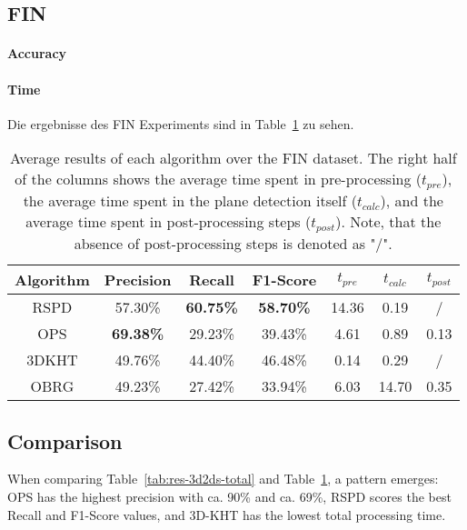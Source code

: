 \documentclass[main.tex]{subfiles}
\begin{document}
\subsection{FIN}

\paragraph{Accuracy}

\paragraph{Time}

Die ergebnisse des FIN Experiments sind in Table~\ref{tab:res-fin-total} zu sehen.

\begin{table}[H]
    \centering
    \begin{tabular}{c|cccccc}
        Algorithm & Precision        & Recall           & F1-Score         & $t_{pre}$ & $t_{calc}$ & $t_{post}$ \\ \hline
        RSPD      & 57.30\%          & \textbf{60.75\%} & \textbf{58.70\%} & 14.36     & 0.19       & /          \\
        OPS       & \textbf{69.38\%} & 29.23\%          & 39.43\%          & 4.61      & 0.89       & 0.13       \\
        3DKHT     & 49.76\%          & 44.40\%          & 46.48\%          & 0.14      & 0.29       & /          \\
        OBRG      & 49.23\%          & 27.42\%          & 33.94\%          & 6.03      & 14.70      & 0.35
    \end{tabular}
    \caption[Overall 2D-3D-S Results]{Average results of each algorithm over the FIN dataset. The right half of the columns shows the average time spent in
        pre-processing ($t_{pre}$), the average time spent in the plane detection itself ($t_{calc}$), and the average time spent in post-processing steps ($t_{post}$).
        Note, that the absence of post-processing steps is denoted as "/".}
    \label{tab:res-fin-total}
\end{table}

\subsection{Comparison}
When comparing Table~\ref{tab:res-3d2ds-total} and Table~\ref{tab:res-fin-total}, a pattern emerges:
OPS has the highest precision with ca. 90\% and ca. 69\%, RSPD scores the best Recall and F1-Score values, and 3D-KHT has the lowest total
processing time.
\end{document}
